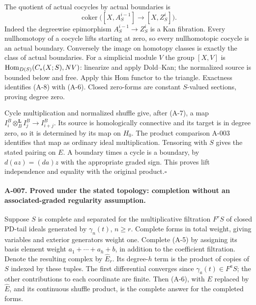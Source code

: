 The quotient of actual cocycles by actual boundaries is
\[
 \operatorname{coker}\bigl([X,A_S^{i-1}]\to[X,Z_S^i]\bigr).
 \tag{A-8}
\]
Indeed the degreewise epimorphism $A_S^{i-1}\to Z_S^i$ is a Kan
fibration. Every nullhomotopy of a cocycle lifts starting at zero,
so every nullhomotopic cocycle is an actual boundary. Conversely the
image on homotopy classes is exactly the class of actual boundaries.
For a simplicial module $V$ the group $[X,V]$ is
$\operatorname{Hom}_{D(S)}(C_*(X;S),NV)$: linearize and apply Dold--Kan; the
normalized source is bounded below and free. Apply this Hom functor
to the triangle. Exactness identifies (A-8) with (A-6). Closed
zero-forms are constant $S$-valued sections, proving degree zero.

Cycle multiplication and normalized shuffle give, after (A-7), a map
$I_i^B\otimes_B^{\mathbf L}I_j^B\to I_{i+j}^B$. Its source is
homologically connective and its target is in degree zero, so it is
determined by its map on $H_0$. The product comparison A-003 identifies
that map as ordinary ideal multiplication. Tensoring with $S$ gives
the stated pairing on $E$. A boundary times a cycle is a boundary,
by $d(az)=(da)z$ with the appropriate graded sign. This proves lift
independence and equality with the original product.\hfill$\square$

\paragraph{A-007. Proved under the stated topology: completion without
an associated-graded regularity assumption.}
Suppose $S$ is complete and separated for the multiplicative filtration
$F^rS$ of closed PD-tail ideals generated by $\gamma_n(t)$, $n\geq r$.
Complete forms in total weight, giving variables and exterior generators
weight one. Complete (A-5) by assigning its basis element weight
$a_1+\cdots+a_h+b$, in addition to the coefficient filtration. Denote
the resulting complex by $\widehat E_r$. Its degree-$h$ term is the
product of copies of $S$ indexed by these tuples. The first differential
converges since $\gamma_a(t)\in F^aS$; the other contributions to
each coordinate are finite. Then (A-6), with $E$ replaced by
$\widehat E$, and its continuous shuffle product, is the complete
answer for the completed forms.

